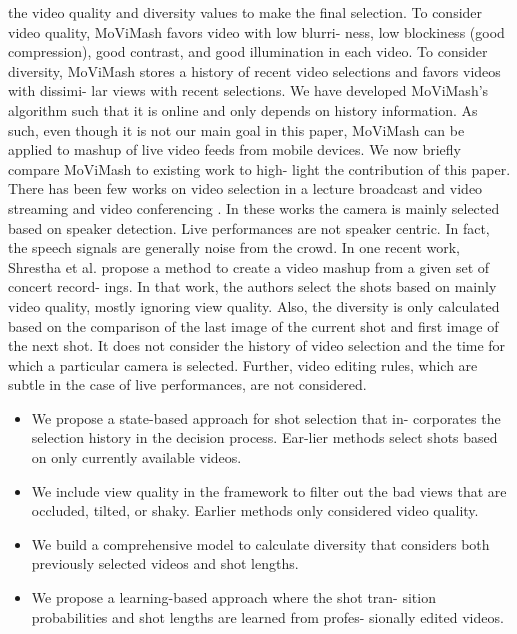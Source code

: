 \documentclass{sig-alternate}
\begin{document}
the video quality and diversity values to make the final selection.
To consider video quality, MoViMash favors video with low blurri-
ness, low blockiness (good compression), good contrast, and good
illumination in each video. To consider diversity, MoViMash stores
a history of recent video selections and favors videos with dissimi-
lar views with recent selections.
We have developed MoViMash’s algorithm such that it is online
and only depends on history information. As such, even though
it is not our main goal in this paper, MoViMash can be applied to
mashup of live video feeds from mobile devices.
We now briefly compare MoViMash to existing work to high-
light the contribution of this paper. There has been few works on
video selection in a lecture broadcast and video streaming \cite{salas:twentyone} \cite{salas:six}
and video conferencing \cite{salas:three}. In these works the camera is mainly
selected based on speaker detection. Live performances are not
speaker centric. In fact, the speech signals are generally noise from
the crowd. In one recent work, Shrestha et al. \cite{salas:fifteen} propose a
method to create a video mashup from a given set of concert record-
ings. In that work, the authors select the shots based on mainly
video quality, mostly ignoring view quality. Also, the diversity is
only calculated based on the comparison of the last image of the
current shot and first image of the next shot. It does not consider
the history of video selection and the time for which a particular
camera is selected. Further, video editing rules, which are subtle in
the case of live performances, are not considered.


\begin{itemize}
\item We propose a state-based approach for shot selection that in-
corporates the selection history in the decision process. Ear-lier methods select shots based on only currently available
videos.
\item We include view quality in the framework to filter out the
bad views that are occluded, tilted, or shaky. Earlier methods
only considered video quality.
\item We build a comprehensive model to calculate diversity that
considers both previously selected videos and shot lengths.
\item We propose a learning-based approach where the shot tran-
sition probabilities and shot lengths are learned from profes-
sionally edited videos.
\end{itemize}
\end{document}

